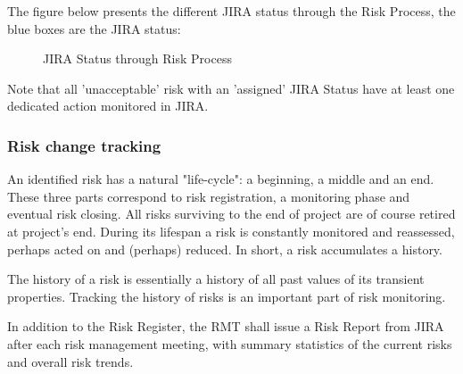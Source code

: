 The figure below presents the different JIRA status through the Risk Process, the blue boxes are the JIRA status:

\begin{figure}[H]
\begin{center}
\end{center}
\caption{JIRA Status through Risk Process}
\label{fig:riskJIRA}
\end{figure}


Note that all 'unacceptable' risk with an 'assigned' JIRA Status have at least one dedicated action monitored in JIRA.

\subsubsection{Risk change tracking}

An identified risk has a natural "life-cycle": a beginning, a middle and an end. These three parts correspond to risk registration, a monitoring phase and eventual risk closing. All risks surviving to the end of project are of course retired at project's end. During its lifespan a risk is constantly monitored and reassessed, perhaps acted on and (perhaps) reduced. In short, a risk accumulates a history.

The history of a risk is essentially a history of all past values of its transient properties. Tracking the history of risks is an important part of risk monitoring.

In addition to the Risk Register, the RMT shall issue a Risk Report from JIRA after each risk management meeting, with summary statistics of the current risks and overall risk trends.
